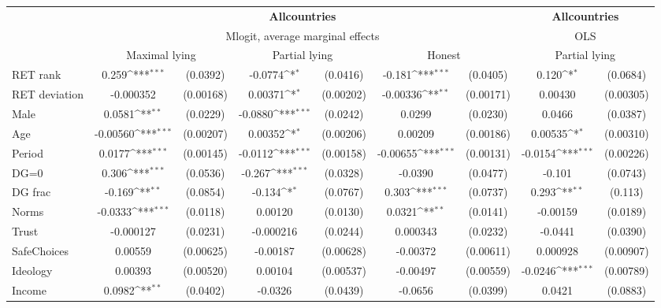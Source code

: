 \def\sym#1{\ifmmode^{#1}\else\(^{#1}\)\fi}
\begin{tabular}{l|cccccc|cc}
\hline\hline
&\multicolumn{6}{c|}{\bf All\space{}countries}&\multicolumn{2}{c}{\bf All\space{}countries}\\ &\multicolumn{6}{c|}{Mlogit, average marginal effects }&\multicolumn{2}{c}{OLS}\\
                &\multicolumn{2}{c}{Maximal lying}&\multicolumn{2}{c}{Partial lying}&\multicolumn{2}{c|}{Honest}  &\multicolumn{2}{c}{Partial lying}\\
\hline
RET rank        &    0.259\sym{***}& (0.0392)&  -0.0774\sym{*}  & (0.0416)&   -0.181\sym{***}& (0.0405)&    0.120\sym{*}  & (0.0684)\\
RET deviation   &-0.000352         &(0.00168)&  0.00371\sym{*}  &(0.00202)& -0.00336\sym{**} &(0.00171)&  0.00430         &(0.00305)\\
Male            &   0.0581\sym{**} & (0.0229)&  -0.0880\sym{***}& (0.0242)&   0.0299         & (0.0230)&   0.0466         & (0.0387)\\
Age             & -0.00560\sym{***}&(0.00207)&  0.00352\sym{*}  &(0.00206)&  0.00209         &(0.00186)&  0.00535\sym{*}  &(0.00310)\\
Period          &   0.0177\sym{***}&(0.00145)&  -0.0112\sym{***}&(0.00158)& -0.00655\sym{***}&(0.00131)&  -0.0154\sym{***}&(0.00226)\\
DG=0          &    0.306\sym{***}& (0.0536)&   -0.267\sym{***}& (0.0328)&  -0.0390         & (0.0477)&   -0.101         & (0.0743)\\
DG frac         &   -0.169\sym{**} & (0.0854)&   -0.134\sym{*}  & (0.0767)&    0.303\sym{***}& (0.0737)&    0.293\sym{**} &  (0.113)\\
Norms           &  -0.0333\sym{***}& (0.0118)&  0.00120         & (0.0130)&   0.0321\sym{**} & (0.0141)& -0.00159         & (0.0189)\\
Trust         &-0.000127         & (0.0231)&-0.000216         & (0.0244)& 0.000343         & (0.0232)&  -0.0441         & (0.0390)\\
SafeChoices     &  0.00559         &(0.00625)& -0.00187         &(0.00628)& -0.00372         &(0.00611)& 0.000928         &(0.00907)\\
Ideology        &  0.00393         &(0.00520)&  0.00104         &(0.00537)& -0.00497         &(0.00559)&  -0.0246\sym{***}&(0.00789)\\
Income          &   0.0982\sym{**} & (0.0402)&  -0.0326         & (0.0439)&  -0.0656         & (0.0399)&   0.0421         & (0.0883)\\

\end{tabular}
